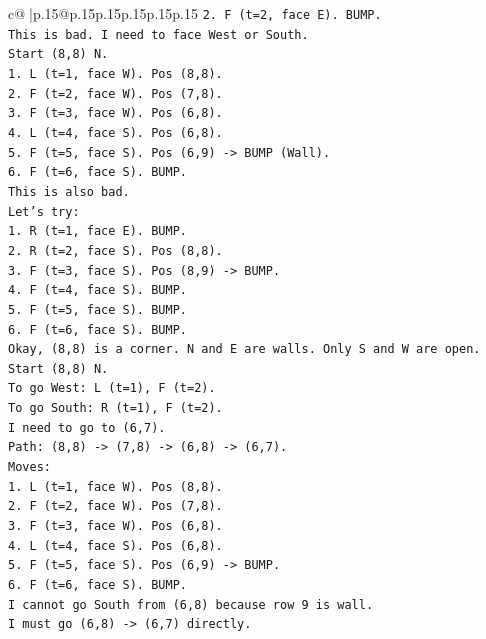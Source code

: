 \documentclass{article}
\begin{document}
{\begin{supertabular}{c@{$\;$}|p{.15\linewidth}@{}p{.15\linewidth}p{.15\linewidth}p{.15\linewidth}p{.15\linewidth}p{.15\linewidth}}
{{{\texttt{2. F (t=2, face E). BUMP.} \\
\texttt{This is bad. I need to face West or South.} \\
\texttt{Start (8,8) N.} \\
\texttt{1. L (t=1, face W). Pos (8,8).} \\
\texttt{2. F (t=2, face W). Pos (7,8).} \\
\texttt{3. F (t=3, face W). Pos (6,8).} \\
\texttt{4. L (t=4, face S). Pos (6,8).} \\
\texttt{5. F (t=5, face S). Pos (6,9) {-}> BUMP (Wall).} \\
\texttt{6. F (t=6, face S). BUMP.} \\
\texttt{This is also bad.} \\
\texttt{Let's try:} \\
\texttt{1. R (t=1, face E). BUMP.} \\
\texttt{2. R (t=2, face S). Pos (8,8).} \\
\texttt{3. F (t=3, face S). Pos (8,9) {-}> BUMP.} \\
\texttt{4. F (t=4, face S). BUMP.} \\
\texttt{5. F (t=5, face S). BUMP.} \\
\texttt{6. F (t=6, face S). BUMP.} \\
\texttt{Okay, (8,8) is a corner. N and E are walls. Only S and W are open.} \\
\texttt{Start (8,8) N.} \\
\texttt{To go West: L (t=1), F (t=2).} \\
\texttt{To go South: R (t=1), F (t=2).} \\
\texttt{I need to go to (6,7).} \\
\texttt{Path: (8,8) {-}> (7,8) {-}> (6,8) {-}> (6,7).} \\
\texttt{Moves:} \\
\texttt{1. L (t=1, face W). Pos (8,8).} \\
\texttt{2. F (t=2, face W). Pos (7,8).} \\
\texttt{3. F (t=3, face W). Pos (6,8).} \\
\texttt{4. L (t=4, face S). Pos (6,8).} \\
\texttt{5. F (t=5, face S). Pos (6,9) {-}> BUMP.} \\
\texttt{6. F (t=6, face S). BUMP.} \\
\texttt{I cannot go South from (6,8) because row 9 is wall.} \\
\texttt{I must go (6,8) {-}> (6,7) directly.} \\
}}}
\end{supertabular}}
\end{document}
